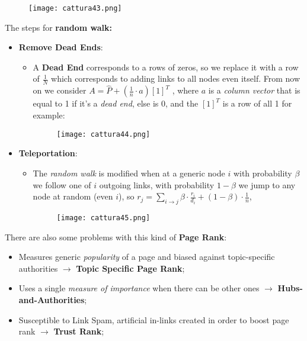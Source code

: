 \documentclass{article}
\begin{document}
\begin{figure}[H]
  \centering
  \texttt{[image: cattura43.png]}
\end{figure}
The steps for \textbf{random walk:}
\begin{itemize}
\item \textbf{Remove Dead Ends}:
\begin{itemize}
\item A \textbf{Dead End} corresponds to a rows of zeros, so we replace it with a row of $\frac{1}{N}$ which corresponds to adding links to all nodes even itself. From now on we consider $A = \hat{P} + (\frac{1}{n}\cdot a) \left[1\right]^T$ , where $a$ is a \emph{column vector} that is equal to 1 if it's a \emph{dead end}, else is 0, and the $\left[1 \right]^T$ is a row of all 1 for example:
\begin{figure}[H]
  \centering
  \texttt{[image: cattura44.png]}
\end{figure}
\end{itemize}
\item \textbf{Teleportation}:
\begin{itemize}
\item The \emph{random walk} is modified when at a generic node $i$ with probability $\beta$ we follow one of $i$ outgoing links, with probability $1-\beta$ we jump to any node at random (even $i$), so $r_j = \sum_{i\rightarrow j} \beta \cdot \frac{r_i}{d_i} + (1 -\beta)\cdot \frac{1}{n}$, 
\begin{figure}[H]
  \centering
  \texttt{[image: cattura45.png]}
\end{figure}
\end{itemize}
\end{itemize}
There are also some problems with this kind of \textbf{Page Rank}:
\begin{itemize}
\item Measures generic \emph{popularity} of a page and biased against topic-specific authorities $\rightarrow$ \textbf{Topic Specific Page Rank}; 
\item Uses a single \emph{measure of importance} when there can be other ones $\rightarrow$ \textbf{Hubs-and-Authorities};
\item Susceptible to Link Spam, artificial in-links created in order to boost page rank $\rightarrow$ \textbf{Trust Rank};
\end{itemize}
\end{document}
